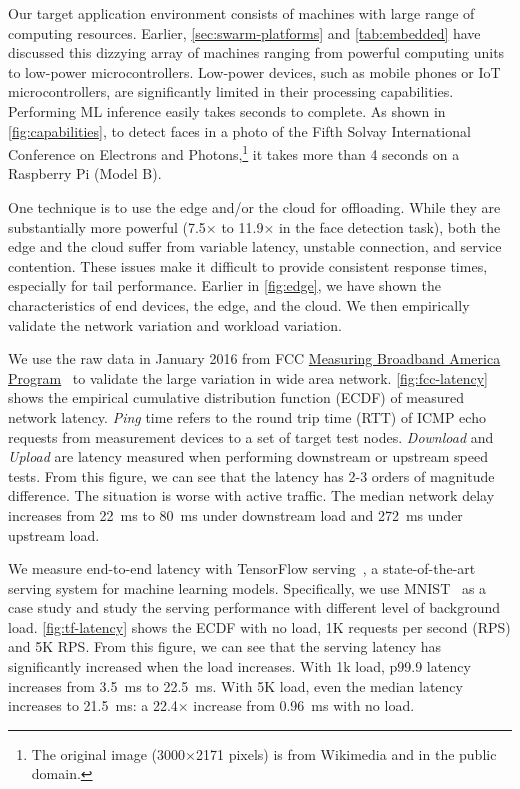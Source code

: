 Our target application environment consists of machines with large range of
computing resources. Earlier, \autoref{sec:swarm-platforms} and
\autoref{tab:embedded} have discussed this dizzying array of machines ranging
from powerful computing units to low-power microcontrollers.  Low-power devices,
such as mobile phones or IoT microcontrollers, are significantly limited in
their processing capabilities. Performing ML inference easily takes seconds to
complete. As shown in \autoref{fig:capabilities}, to detect faces in a photo of
the Fifth Solvay International Conference on Electrons and Photons,\footnote{The
  original image (3000$\times$2171 pixels) is from Wikimedia and in the public
  domain.} it takes more than 4 seconds on a Raspberry Pi (Model B).

One technique is to use the edge and/or the cloud for offloading. While they are
substantially more powerful (7.5$\times$ to 11.9$\times$ in the face detection
task), both the edge and the cloud suffer from variable latency, unstable
connection, and service contention. These issues make it difficult to provide
consistent response times, especially for tail performance. Earlier in
\autoref{fig:edge}, we have shown the characteristics of end devices, the edge,
and the cloud. We then empirically validate the network variation and workload
variation.

 We use the raw data in January 2016 from FCC
\href{https://www.fcc.gov/general/measuring-broadband-america}{Measuring
  Broadband America Program}~\cite{fcc} to validate the large variation in wide
area network. \autoref{fig:fcc-latency} shows the empirical cumulative
distribution function (ECDF) of measured network latency. \textit{Ping} time refers to
the round trip time (RTT) of ICMP echo requests from measurement devices to a
set of target test nodes. \textit{Download} and \textit{Upload} are latency
measured when performing downstream or upstream speed tests. From this figure,
we can see that the latency has 2-3 orders of magnitude difference. The
situation is worse with active traffic. The median network delay increases from
\SI{22}{\ms} to \SI{80}{\ms} under downstream load and \SI{272}{\ms} under
upstream load.

 \noindent We measure end-to-end latency with
TensorFlow serving~\cite{olston2017tensorflow}, a state-of-the-art serving
system for machine learning models. Specifically, we use
MNIST~\cite{lecun1998mnist} as a case study and study the serving performance
with different level of background load. \autoref{fig:tf-latency} shows the ECDF
with no load, 1K requests per second (RPS) and 5K RPS. From this figure, we can
see that the serving latency has significantly increased when the load
increases. With 1k load, p99.9 latency increases from \SI{3.5}{\ms} to
\SI{22.5}{\ms}. With 5K load, even the median latency increases to
\SI{21.5}{\ms}: a 22.4$\times$ increase from \SI{0.96}{\ms} with no load.

